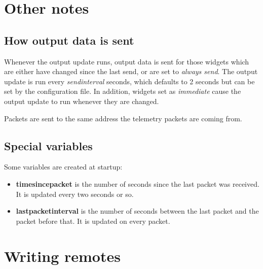 \section{Other notes}

\subsection{How output data is sent}
\label{subhowout}
Whenever the output update runs, output data is sent for those widgets which
are either have changed since the last send, or are set to \emph{always send}.
The output update is run every \emph{sendinterval} seconds, which defaults to
2 seconds but can be set by the configuration file. In addition, widgets set
as \emph{immediate} cause the output update to run whenever they are changed.

Packets are sent to the same address the telemetry packets are coming from.


\subsection{Special variables}
Some variables are created at startup:
\begin{itemize}
\item \textbf{timesincepacket} is the number of seconds since the last packet
was received. It is updated every two seconds or so.
\item \textbf{lastpacketinterval} is the number of seconds between the last
packet and the packet before that. It is updated on every packet.
\end{itemize}

\section{Writing remotes}
\label{secclient}
